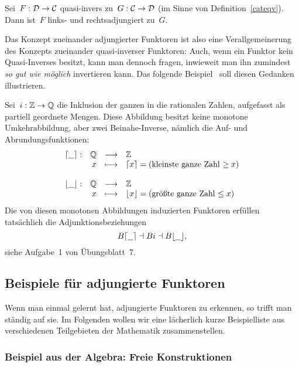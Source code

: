 \begin{bsp}Sei~$F:\mathcal{D} \to \mathcal{C}$ quasi-invers zu~$G:\mathcal{C} \to \mathcal{D}$ (im Sinne von
Definition~\ref{cateqv}). Dann ist~$F$ links- und rechtsadjungiert
zu~$G$.\end{bsp}
Das Konzept zueinander adjungierter Funktoren ist also eine Verallgemeinerung
des Konzepts zueinander quasi-inverser Funktoren: Auch, wenn ein Funktor kein
Quasi-Inverses besitzt, kann man dennoch fragen, inwieweit man ihn zumindest
\emph{so gut wie möglich} invertieren kann. Das folgende Beispiel~\cite{smith}
soll diesen Gedanken illustrieren.

\begin{bsp}Sei~$i:\mathbb{Z} \to \mathbb{Q}$ die Inklusion der ganzen in die rationalen Zahlen,
aufgefasst als partiell geordnete Mengen. Diese Abbildung besitzt keine
monotone Umkehrabbildung, aber zwei Beinahe-Inverse, nämlich die Auf- und
Abrundungsfunktionen:
\[ \begin{array}{@{}rrcl@{}}
  \lceil \freist \rceil : & \QQ &\longrightarrow& \ZZ \\
  & x &\longmapsto& \lceil x \rceil = \text{(kleinste ganze Zahl $\geq x$)} \\\\
  \lfloor \freist \rfloor : & \QQ &\longrightarrow& \ZZ \\
  & x &\longmapsto& \lfloor x \rfloor = \text{(größte ganze Zahl $\leq x$)}
\end{array} \]
Die von diesen monotonen Abbildungen induzierten Funktoren erfüllen tatsächlich
die Adjunktionsbeziehungen
\[ B\lceil\underline{\ \ }\rceil \dashv Bi \dashv B\lfloor\underline{\ \ }\rfloor, \]
siehe Aufgabe~1 von Übungsblatt~7.\end{bsp}


\subsection{Beispiele für adjungierte Funktoren}

Wenn man einmal gelernt hat, adjungierte Funktoren zu erkennen, so trifft man
ständig auf sie. Im Folgenden wollen wir eine lächerlich kurze Beispielliste
aus verschiedenen Teilgebieten der Mathematik zusammenstellen.

\subsubsection*{Beispiel aus der Algebra: Freie Konstruktionen}

